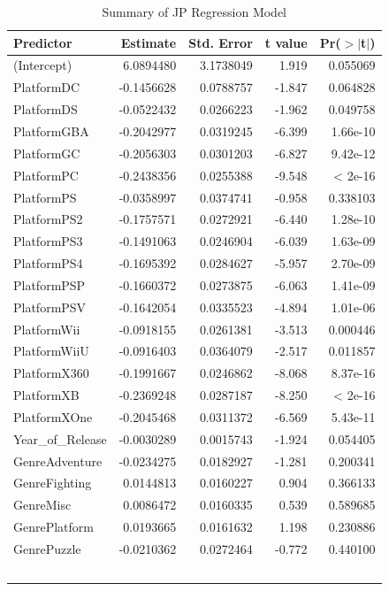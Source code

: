 \documentclass[12pt]{article}
\begin{document}
\begin{table}[ht]
  \caption{Summary of JP Regression Model}
  \label{tab:JP}
\centering
\begin{tabular}{lrrrr}
\hline
Predictor & Estimate & Std. Error & t value & Pr($>$$|$t$|$) \\ 
\hline
(Intercept) & 6.0894480 & 3.1738049 & 1.919 & 0.055069 \\
PlatformDC & -0.1456628 & 0.0788757 & -1.847 & 0.064828 \\
PlatformDS & -0.0522432 & 0.0266223 & -1.962 & 0.049758 \\
PlatformGBA & -0.2042977 & 0.0319245 & -6.399 & 1.66e-10 \\
PlatformGC & -0.2056303 & 0.0301203 & -6.827 & 9.42e-12 \\
PlatformPC & -0.2438356 & 0.0255388 & -9.548 & < 2e-16 \\
PlatformPS & -0.0358997 & 0.0374741 & -0.958 & 0.338103 \\
PlatformPS2 & -0.1757571 & 0.0272921 & -6.440 & 1.28e-10 \\
PlatformPS3 & -0.1491063 & 0.0246904 & -6.039 & 1.63e-09 \\
PlatformPS4 & -0.1695392 & 0.0284627 & -5.957 & 2.70e-09 \\
PlatformPSP & -0.1660372 & 0.0273875 & -6.063 & 1.41e-09 \\
PlatformPSV & -0.1642054 & 0.0335523 & -4.894 & 1.01e-06 \\
PlatformWii & -0.0918155 & 0.0261381 & -3.513 & 0.000446 \\
PlatformWiiU & -0.0916403 & 0.0364079 & -2.517 & 0.011857 \\
PlatformX360 & -0.1991667 & 0.0246862 & -8.068 & 8.37e-16 \\
PlatformXB & -0.2369248 & 0.0287187 & -8.250 & < 2e-16 \\
PlatformXOne & -0.2045468 & 0.0311372 & -6.569 & 5.43e-11 \\
Year\_of\_Release & -0.0030289 & 0.0015743 & -1.924 & 0.054405 \\
GenreAdventure & -0.0234275 & 0.0182927 & -1.281 & 0.200341 \\
GenreFighting & 0.0144813 & 0.0160227 & 0.904 & 0.366133 \\
GenreMisc & 0.0086472 & 0.0160335 & 0.539 & 0.589685 \\
GenrePlatform & 0.0193665 & 0.0161632 & 1.198 & 0.230886 \\
GenrePuzzle & -0.0210362 & 0.0272464 & -0.772 & 0.440100 \\
$$
\end{tabular}
\end{table}
\end{document}
